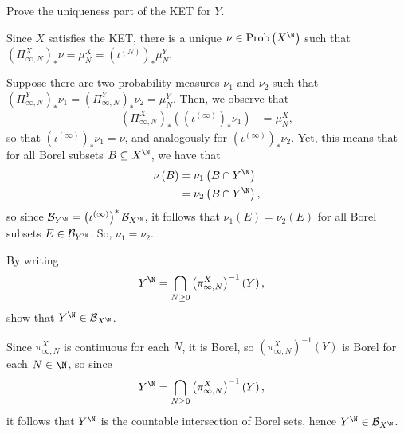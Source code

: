 \documentclass[10pt]{mypackage}
\begin{document}
\begin{problem}[Problem IV.12]
  Prove the uniqueness part of the KET for $Y$.
\end{problem}
\begin{solution}
  Since $X$ satisfies the KET, there is a unique $\nu\in \operatorname{Prob}\left( X^{\N} \right)$ such that $\left( \Pi^X_{\infty,N} \right)_{\ast}\nu = \mu_N^X = \left( \iota^{(N)} \right)_{\ast}\mu_N^Y$.

  Suppose there are two probability measures $\nu_1$ and $\nu_2$ such that $\left( \Pi^Y_{\infty,N} \right)_{\ast}\nu_1 = \left( \Pi^Y_{\infty,N} \right)_{\ast}\nu_2 = \mu^Y_N$. Then, we observe that
  \begin{align*}
    \left( \Pi^{X}_{\infty,N}\right)_{\ast}\left( \left( \iota^{(\infty)} \right)_{\ast}\nu_{1} \right) &= \mu_{N}^X,
  \end{align*}
  so that $\left( \iota^{(\infty)} \right)_{\ast}\nu_1 = \nu$, and analogously for $\left( \iota^{(\infty)} \right)_{\ast}\nu_2$. Yet, this means that for all Borel subsets $B\subseteq X^{\N}$, we have that
  \begin{align*}
    \nu\left( B \right) &= \nu_1\left( B\cap Y^{\N} \right)\\
                        &= \nu_2\left( B\cap Y^{\N} \right),
  \end{align*}
  so since $\mathcal{B}_{Y^{\N}} = \left( \iota^{(\infty)} \right)^{\ast}\mathcal{B}_{X^{\N}}$, it follows that $\nu_1\left( E \right) = \nu_2\left( E \right)$ for all Borel subsets $E\in \mathcal{B}_{Y^{\N}}$. So, $\nu_1 = \nu_2$.
\end{solution}
\begin{problem}[Problem IV.13]
  By writing
  \begin{align*}
    Y^{\N} &= \bigcap_{N\geq 0} \left( \pi^{X}_{\infty,N} \right)^{-1}\left( Y \right),
  \end{align*}
  show that $Y^{\N}\in \mathcal{B}_{X^{\N}}$.
\end{problem}
\begin{solution}
  Since $\pi^X_{\infty,N}$ is continuous for each $N$, it is Borel, so $\left( \pi_{\infty,N}^X \right)^{-1}\left( Y \right)$ is Borel for each $N\in \N$, so since
  \begin{align*}
    Y^{\N} &= \bigcap_{N\geq 0} \left( \pi^X_{\infty,N} \right)^{-1}\left( Y \right),
  \end{align*}
  it follows that $Y^{\N}$ is the countable intersection of Borel sets, hence $Y^{\N}\in \mathcal{B}_{X^{\N}}$.
\end{solution}
\end{document}
